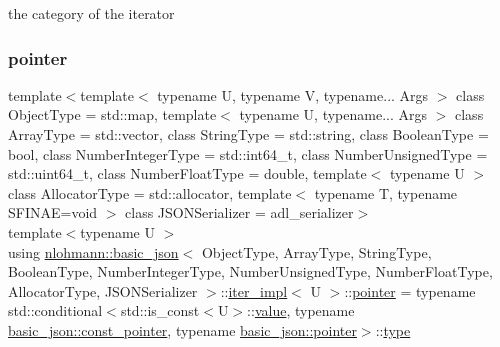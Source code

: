 the category of the iterator 

\mbox{\label{classnlohmann_1_1basic__json_1_1iter__impl_a3dddd7fa38b36e2531700ceb4a1ce9a8}} 
\subsubsection{\texorpdfstring{pointer}{pointer}}
{\footnotesize\ttfamily template$<$template$<$ typename U, typename V, typename... Args $>$ class Object\+Type = std\+::map, template$<$ typename U, typename... Args $>$ class Array\+Type = std\+::vector, class String\+Type  = std\+::string, class Boolean\+Type  = bool, class Number\+Integer\+Type  = std\+::int64\+\_\+t, class Number\+Unsigned\+Type  = std\+::uint64\+\_\+t, class Number\+Float\+Type  = double, template$<$ typename U $>$ class Allocator\+Type = std\+::allocator, template$<$ typename T, typename S\+F\+I\+N\+A\+E=void $>$ class J\+S\+O\+N\+Serializer = adl\+\_\+serializer$>$ \\
template$<$typename U $>$ \\
using \mbox{\hyperlink{classnlohmann_1_1basic__json}{nlohmann\+::basic\+\_\+json}}$<$ Object\+Type, Array\+Type, String\+Type, Boolean\+Type, Number\+Integer\+Type, Number\+Unsigned\+Type, Number\+Float\+Type, Allocator\+Type, J\+S\+O\+N\+Serializer $>$\+::\mbox{\hyperlink{classnlohmann_1_1basic__json_1_1iter__impl}{iter\+\_\+impl}}$<$ U $>$\+::\mbox{\hyperlink{classnlohmann_1_1basic__json_1_1iter__impl_a3dddd7fa38b36e2531700ceb4a1ce9a8}{pointer}} =  typename std\+::conditional$<$std\+::is\+\_\+const$<$U$>$\+::\mbox{\hyperlink{classnlohmann_1_1basic__json_1_1iter__impl_a92e849ca687355935c02f492be936b68}{value}}, typename \mbox{\hyperlink{classnlohmann_1_1basic__json_aff3d5cd2a75612364b888d8693231b58}{basic\+\_\+json\+::const\+\_\+pointer}}, typename \mbox{\hyperlink{classnlohmann_1_1basic__json_aefee1f777198c68724bd127e0c8abbe4}{basic\+\_\+json\+::pointer}}$>$\+::\mbox{\hyperlink{classnlohmann_1_1basic__json_a2b2d781d7f2a4ee41bc0016e931cadf7}{type}}}



